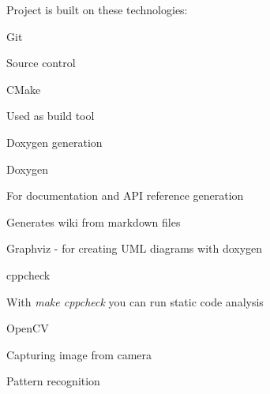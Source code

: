 Project is built on these technologies\+:


\begin{DoxyItemize}
\item Git
\begin{DoxyItemize}
\item Source control
\end{DoxyItemize}
\item C\+Make
\begin{DoxyItemize}
\item Used as build tool
\item Doxygen generation
\end{DoxyItemize}
\item Doxygen
\begin{DoxyItemize}
\item For documentation and A\+PI reference generation
\item Generates wiki from markdown files
\item Graphviz -\/ for creating U\+ML diagrams with doxygen
\end{DoxyItemize}
\item cppcheck
\begin{DoxyItemize}
\item With {\itshape make cppcheck} you can run static code analysis
\end{DoxyItemize}
\item Open\+CV
\begin{DoxyItemize}
\item Capturing image from camera
\item Pattern recognition 
\end{DoxyItemize}
\end{DoxyItemize}